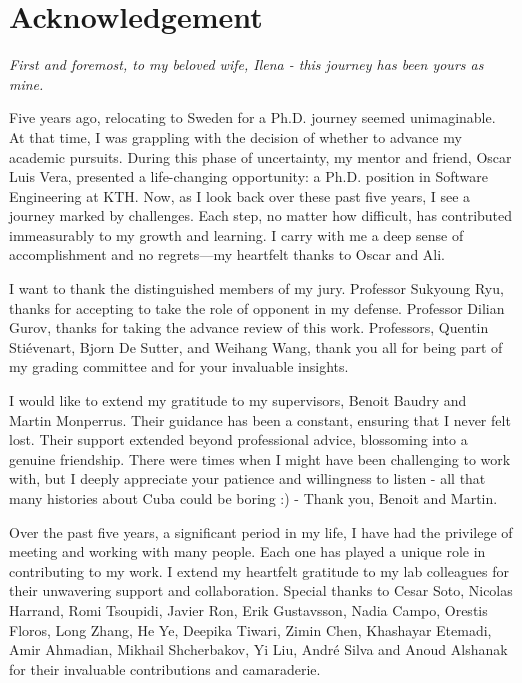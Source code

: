 
\chapter{Acknowledgement}

{
\small
\emph{First and foremost, to my beloved wife, Ilena - this journey has been yours as mine.}
\vspace{0.6cm}

Five years ago, relocating to Sweden for a Ph.D. journey seemed unimaginable. At that time, I was grappling with the decision of whether to advance my academic pursuits. During this phase of uncertainty, my mentor and friend, Oscar Luis Vera, presented a life-changing opportunity: a Ph.D. position in Software Engineering at KTH. Now, as I look back over these past five years, I see a journey marked by challenges. Each step, no matter how difficult, has contributed immeasurably to my growth and learning. I carry with me a deep sense of accomplishment and no regrets—my heartfelt thanks to Oscar and Ali.

I want to thank the distinguished members of my jury. Professor Sukyoung Ryu, thanks for accepting to take the role of opponent in my defense. Professor Dilian Gurov, thanks for taking the advance review of this work. Professors, Quentin Stiévenart, Bjorn De Sutter, and Weihang Wang, thank you all for being part of my grading committee and for your invaluable insights.

I would like to extend my gratitude to my supervisors, Benoit Baudry and Martin Monperrus. Their guidance has been a constant, ensuring that I never felt lost. Their support extended beyond professional advice, blossoming into a genuine friendship. There were times when I might have been challenging to work with, but I deeply appreciate your patience and willingness to listen - all that many histories about Cuba could be boring :) - Thank you, Benoit and Martin.

Over the past five years, a significant period in my life, I have had the privilege of meeting and working with many people. Each one has played a unique role in contributing to my work. I extend my heartfelt gratitude to my lab colleagues for their unwavering support and collaboration. Special thanks to Cesar Soto, Nicolas Harrand, Romi Tsoupidi, Javier Ron, Erik Gustavsson, Nadia Campo, Orestis Floros, Long Zhang, He Ye, Deepika Tiwari, Zimin Chen, Khashayar Etemadi, Amir Ahmadian,  Mikhail Shcherbakov, Yi Liu, André Silva and Anoud Alshanak for their invaluable contributions and camaraderie.

}
